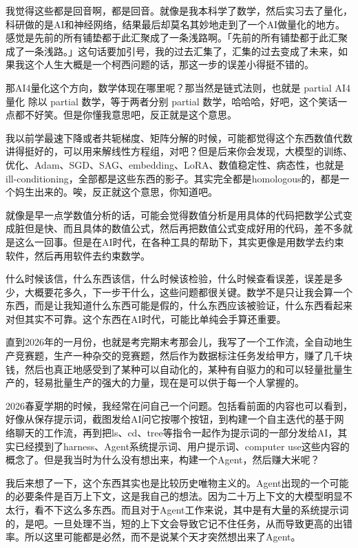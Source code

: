 我觉得这些都是回音啊，都是回音。就像是我本科学了数学，然后实习去了量化，科研做的是AI和神经网络，结果最后却莫名其妙地走到了一个AI做量化的地方。感觉是先前的所有铺垫都于此汇聚成了一条浅路啊。「先前的所有铺垫都于此汇聚成了一条浅路。」这句话要加引号，我的过去汇集了，汇集的过去变成了未来，如果我这个人生大概是一个柯西问题的话，那这一步的误差小得挺不错的。

那AI4量化这个方向，数学体现在哪里呢？那当然是链式法则，也就是 partial AI4量化 除以 partial 数学，等于两者分别 partial 数学，哈哈哈，好吧，这个笑话一点都不好笑。但是你懂我意思吧，反正就是这个意思。

我以前学最速下降或者共轭梯度、矩阵分解的时候，可能都觉得这个东西数值代数讲得挺好的，可以用来解线性方程组，对吧？但是后来你会发现，大模型的训练、优化、Adam、SGD、SAG、embedding、LoRA、数值稳定性、病态性，也就是ill-conditioning，全部都是这些东西的影子。其实完全都是homologous的，都是一个妈生出来的。唉，反正就这个意思，你知道吧。

就像是早一点学数值分析的话，可能会觉得数值分析是用具体的代码把数学公式变成脏但是快、而且具体的数值公式，然后再把数值公式变成好用的代码，差不多就是这么一回事。但是在AI时代，在各种工具的帮助下，其实更像是用数学去约束软件，然后再用软件去约束数学。

什么时候该信，什么东西该信，什么时候该检验，什么时候查看误差，误差是多少，大概要花多久，下一步干什么，这些问题都很关键。数学不是只让我会算一个东西，而是让我知道什么东西可能是假的，什么东西应该被验证，什么东西看起来对但其实不可靠。这个东西在AI时代，可能比单纯会手算还重要。

直到2026年的一月份，也就是考完期末考那会儿，我写了一个工作流，全自动地生产竞赛题，生产一种杂交的竞赛题，然后作为数据标注任务发给甲方，赚了几千块钱，然后也真正地感受到了某种可以自动化的，某种有自驱力的和可以轻量批量生产的，轻易批量生产的强大的力量，现在是可以供于每一个人掌握的。

2026春夏学期的时候，我经常在问自己一个问题。包括看前面的内容也可以看到，好像从保存提示词，截图发给AI问它按哪个按钮，到构建一个自主迭代的基于网络聊天的工作流，再到把ls、cd、tree等指令一起作为提示词的一部分发给AI，其实已经摸到了harness、Agent系统提示词、用户提示词、computer use这些内容的概念了。但是我当时为什么没有想出来，构建一个Agent，然后赚大米呢？

我后来想了一下，这个东西其实也是比较历史唯物主义的。Agent出现的一个可能的必要条件是百万上下文，这是我自己的想法。因为二十万上下文的大模型明显不太行，看不下这么多东西。而且对于Agent工作来说，其中是有大量的系统提示词的，是吧。一旦处理不当，短的上下文会导致它记不住任务，从而导致更高的出错率。所以这里可能都是必然，而不是说某个天才突然想出来了Agent。

